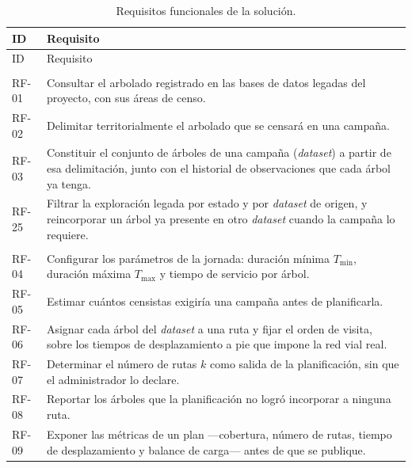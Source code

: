 \begin{xltabular}{\textwidth}{@{}l X@{}}
  \caption{Requisitos funcionales de la solución.}
  \label{tab:requisitos} \\
  \toprule
  ID & Requisito \\
  \midrule
  \endfirsthead
  \toprule
  ID & Requisito \\
  \midrule
  \endhead
  \bottomrule
  \endlastfoot
   \\
  \addlinespace
  RF-01 & Consultar el arbolado registrado en las bases de datos legadas del proyecto, con sus áreas
          de censo. \\
          \addlinespace
  RF-02 & Delimitar territorialmente el arbolado que se censará en una campaña. \\
  \addlinespace
  RF-03 & Constituir el conjunto de árboles de una campaña (\textit{dataset}) a partir de esa
          delimitación, junto con el historial de observaciones que cada árbol ya tenga. \\
          \addlinespace
  RF-25 & Filtrar la exploración legada por estado y por \textit{dataset} de origen, y reincorporar
          un árbol ya presente en otro \textit{dataset} cuando la campaña lo requiere. \\
          \addlinespace
   \\
  \addlinespace
  RF-04 & Configurar los parámetros de la jornada: duración mínima $T_{\min}$, duración máxima
          $T_{\max}$ y tiempo de servicio por árbol. \\
          \addlinespace
  RF-05 & Estimar cuántos censistas exigiría una campaña antes de planificarla. \\
  \addlinespace
  RF-06 & Asignar cada árbol del \textit{dataset} a una ruta y fijar el orden de visita, sobre los
          tiempos de desplazamiento a pie que impone la red vial real. \\
          \addlinespace
  RF-07 & Determinar el número de rutas $k$ como salida de la planificación, sin que el
          administrador lo declare. \\
          \addlinespace
  RF-08 & Reportar los árboles que la planificación no logró incorporar a ninguna ruta. \\
  \addlinespace
  RF-09 & Exponer las métricas de un plan ---cobertura, número de rutas, tiempo de desplazamiento y
          balance de carga--- antes de que se publique. \\

\end{xltabular}
